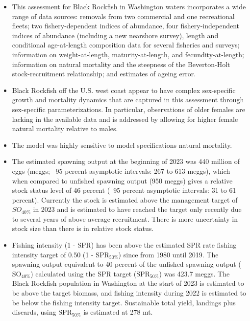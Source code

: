 \documentclass[11pt,
  english,
  letterpaper,
]{article}
\begin{document}
\begin{itemize}

\item This assessment for Black Rockfish in Washington waters incorporates a wide range of data sources: removals from two commercial and one recreational fleets; two fishery-dependent indices of abundance, four fishery-independent indices of abundance (including a new nearshore survey), length and conditional age-at-length composition data for several fisheries and surveys; information on weight-at-length, maturity-at-length, and fecundity-at-length; information on natural mortality and the steepness of the Beverton-Holt stock-recruitment relationship; and estimates of ageing error.

\item Black Rockfish off the U.S. west coast appear to have complex sex-specific growth and mortality dynamics that are captured in this assessment through sex-specific parameterizations. In particular, observations of older females are lacking in the available data and is addressed by allowing for higher female natural mortality relative to males.

\item The model was highly sensitive to model specifications natural mortality. 

\item The estimated spawning output at the beginning of 2023 was 440 million of eggs (meggs; ~95 percent asymptotic intervals: 267 to 613 meggs), which when compared to unfished spawning output (950 meggs) gives a relative stock status level of 46 percent (~95 percent asymptotic intervals: 31 to 61 percent).  Currently the stock is estimated above the management target of $SO_{40\%}$ in 2023 and is estimated to have reached the target only recently due to several years of above average recruitment. There is more uncertainty in stock size than there is in relative stock status.

\item  Fishing intensity (1 - SPR) has been above the estimated SPR rate fishing intensity target of 0.50 (1 - $\text{SPR}_{50\%}$) since from 1980 until 2019. The spawning output equivalent to 40 percent of the unfished spawning output ($\text{SO}_{40\%}$) calculated using the SPR target ($\text{SPR}_{50\%}$) was 423.7 meggs. The Black Rockfish population in Washington at the start of 2023 is estimated to be above the target biomass, and fishing intensity during 2022 is estimated to be below the fishing intensity target. Sustainable total yield, landings plus discards, using $\text{SPR}_{50\%}$ is estimated at 278 mt.   

\end{itemize}
\end{document}
